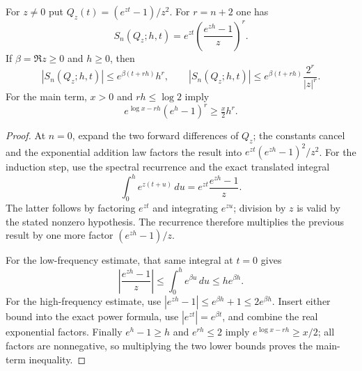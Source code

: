 \begin{lemma}
\label{kernel:spectral-atom}
\leanok
For $z\ne0$ put $Q_z(t)=(e^{zt}-1)/z^2$.
For $r=n+2$ one has
\[
 S_n(Q_z;h,t)=e^{zt}\left(\frac{e^{zh}-1}{z}\right)^r.
\]
If $\beta=\Re z\geq0$ and $h\geq0$, then
\[
 |S_n(Q_z;h,t)|\leq e^{\beta(t+rh)}h^r,
 \qquad
 |S_n(Q_z;h,t)|\leq
       e^{\beta(t+rh)}\frac{2^r}{|z|^r}.
\]
For the main term, $x>0$ and $rh\leq\log2$ imply
\[
 e^{\log x-rh}(e^h-1)^r\geq\tfrac{x}{2}h^r.
\]
\end{lemma}
\begin{proof}
At $n=0$, expand the two forward differences of $Q_z$; the constants
cancel and the exponential addition law factors the result into
$e^{zt}(e^{zh}-1)^2/z^2$.
For the induction step, use the spectral recurrence and the exact
translated integral
\[
 \int_0^h e^{z(t+u)}\,du=e^{zt}\frac{e^{zh}-1}{z}.
\]
The latter follows by factoring $e^{zt}$ and integrating
$e^{zu}$; division by $z$ is valid by the stated nonzero hypothesis.
The recurrence therefore multiplies the previous result by one more
factor $(e^{zh}-1)/z$.

For the low-frequency estimate, that same integral at $t=0$ gives
\[
 \left|\frac{e^{zh}-1}{z}\right|
 \leq\int_0^h e^{\beta u}\,du\leq h e^{\beta h}.
\]
For the high-frequency estimate, use
$|e^{zh}-1|\leq e^{\beta h}+1\leq2e^{\beta h}$.
Insert either bound into the exact power formula, use
$|e^{zt}|=e^{\beta t}$, and combine the real exponential factors.
Finally $e^h-1\geq h$ and $e^{rh}\leq2$ imply
$e^{\log x-rh}\geq x/2$; all factors are nonnegative, so multiplying
the two lower bounds proves the main-term inequality.
\end{proof}

